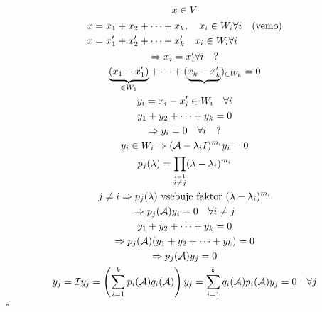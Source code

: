 \begin{gather*}
x \in V \\
\begin{aligned}
x &= x_1 + x_2 + \cdots + x_k, \quad x_i \in W_i \forall i \quad \text{(vemo)} \\
x &= x_1' + x_2' + \cdots + x_k' \quad x_i \in W_i \forall i
\end{aligned} \\
\Rightarrow x_i = x_i' \forall i \quad ? \\
\underbrace{(x_1 - x_1')}_{\in W_1} + \cdots + (\underbrace{x_k - x_k'})_{\in W_k} = 0 \\
y_i = x_i - x_i' \in W_i \quad \forall i \\
y_1 + y_2 + \cdots + y_k = 0 \\
\Rightarrow y_i = 0 \quad \forall i \quad ? \\
y_i \in W_i \Rightarrow (\mathcal{A} - \lambda_i I)^{m_i}y_i =0 \\
p_j(\lambda) = \prod_{\stackrel{i = 1}{i \neq j}} (\lambda - \lambda_i)^{m_i} \\
j \neq i \Rightarrow p_j(\lambda) \text{ vsebuje faktor $(\lambda - \lambda_i)^{m_i}$} \\
\Rightarrow p_j(\mathcal{A})y_i = 0 \quad \forall i \neq j \\
y_1 + y_2 + \cdots + y_k = 0 \\
\Rightarrow p_j(\mathcal{A})(y_1 + y_2 + \cdots + y_k) = 0 \\
\Rightarrow p_j(\mathcal{A}) y_j = 0 \\
y_j = \mathcal{I} y_j = \left(\sum_{i = 1}^{k} p_i(\mathcal{A}) q_i(\mathcal{A}) \right) y_j = \sum_{i=1}^k q_i(\mathcal{A}) p_i(\mathcal{A}) y_j = 0 \quad \forall j
\end{gather*}
\hfill $\square$

